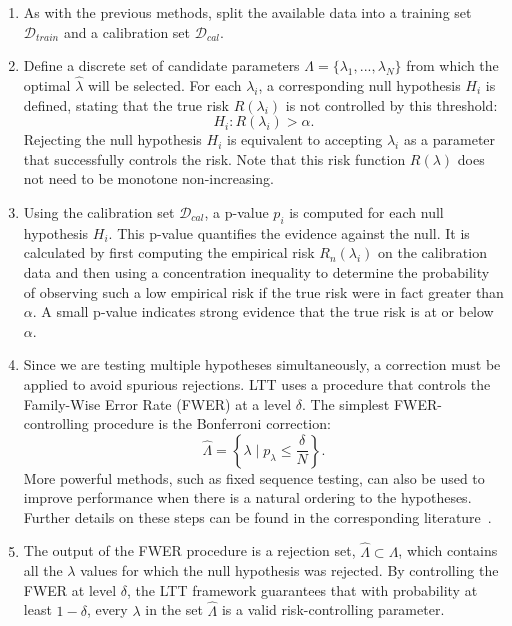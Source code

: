\begin{enumerate}
    \item As with the previous methods, split the available data into
    a training set \(\mathcal{D}_{train}\) and a calibration set \(\mathcal{D}_{cal}\).

    \item Define a discrete set of candidate parameters \(\Lambda = \{ \lambda_1, ..., \lambda_N \}\)
    from which the optimal \(\hat{\lambda}\) will be selected.
    For each \(\lambda_i\), a corresponding null hypothesis \(H_i\) is defined, stating
    that the true risk \(R(\lambda_i)\) is not controlled by this threshold:
    \[
        H_i: R(\lambda_i) > \alpha.
    \]
    Rejecting the null hypothesis \(H_i\) is equivalent to accepting \(\lambda_i\)
    as a parameter that successfully controls the risk.
    Note that this risk function \(R(\lambda)\) does not need to be monotone non-increasing.

    \item Using the calibration set \(\mathcal{D}_{cal}\),
    a p-value \(p_i\) is computed for each null hypothesis \(H_i\).
    This p-value quantifies the evidence against the null.
    It is calculated by first computing the empirical risk \(R_n(\lambda_i)\)
    on the calibration data and then using a concentration inequality
    to determine the probability of observing such a low empirical risk
    if the true risk were in fact greater than \(\alpha\).
    A small p-value indicates strong evidence that the true risk is at or below \(\alpha\).

    \item Since we are testing multiple hypotheses simultaneously, a correction
    must be applied to avoid spurious rejections. LTT uses a procedure that
    controls the Family-Wise Error Rate (FWER) at a level \(\delta\).
    The simplest FWER-controlling procedure is the Bonferroni correction:
    \[
        \hat{\Lambda} = \left\{ \lambda \mid p_\lambda \leq \frac{\delta}{N} \right\}.
    \]
    More powerful methods, such as fixed sequence testing,
    can also be used to improve performance when there is a natural ordering to the hypotheses.
    Further details on these steps can be found
    in the corresponding literature~\cite{angelopoulos2022ltt, angelopoulos2022gentle}.

    \item The output of the FWER procedure is a rejection set, \(\hat{\Lambda} \subset \Lambda\),
    which contains all the \(\lambda\) values for which the null hypothesis was rejected.
    By controlling the FWER at level \(\delta\), the LTT framework guarantees that
    with probability at least \(1-\delta\), every \(\lambda\) in the set \(\hat{\Lambda}\)
    is a valid risk-controlling parameter.


\end{enumerate}
